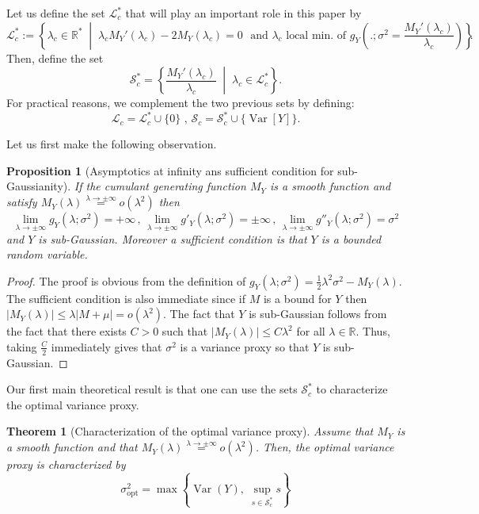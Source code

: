 \documentclass[a4paper, 10pt]{article}
\newcommand{\beq}{\begin{equation}}
\newcommand{\eeq}{\end{equation}}
\newtheorem{theorem}{Theorem}[section]
\newtheorem{proposition}{Proposition}[section]
\theoremstyle{definition}
\begin{document}
Let us define the set $\mathcal{L}_c^*$ that will play an important role in this paper by
\beq \mathcal{L}_c^*:=\left\{\lambda_c \in \mathbb{R}^* \;\middle|\;  \lambda_c M_Y'(\lambda_c)- 2M_Y(\lambda_c)=0 \,\, \text{ and }\lambda_c \text{ local min. of } g_Y\left(.;\sigma^2=\frac{ M_Y'(\lambda_c)}{\lambda_c}\right) \right\}.\eeq
Then, define the set
\beq \mathcal{S}_c^*=\left\{\frac{M_Y'(\lambda_c)}{\lambda_c}  \;\middle|\; \lambda_c\in \mathcal{L}_c^*\right\}.\eeq
For practical reasons, we complement the two previous sets by defining:
\beq \mathcal{L}_c=\mathcal{L}_c^*\cup\{0\}\,\,, \,\mathcal{S}_c=\mathcal{S}_c^*\cup\{\operatorname{Var}[Y]\}.\eeq 

Let us first make the following observation.
\begin{proposition}[Asymptotics at infinity ans sufficient condition for sub-Gaussianity]\label{AsymptInf}If the cumulant generating function $M_Y$ is a smooth function and satisfy $M_Y(\lambda)\overset{\lambda\to\pm \infty}{=}o(\lambda^2)$ then
\beq \lim_{\lambda\to \pm\infty}g_Y(\lambda;\sigma^2)=+\infty\,,\, \lim_{\lambda\to \pm\infty}g'_Y(\lambda;\sigma^2)=\pm\infty\,,\, \lim_{\lambda\to \pm\infty}g''_Y(\lambda;\sigma^2)=\sigma^2\eeq
and $Y$ is sub-Gaussian. Moreover a sufficient condition is that $Y$ is a bounded random variable.    
\end{proposition}

\begin{proof}The proof is obvious from the definition of $g_Y(\lambda;\sigma^2)=\frac{1}{2}\lambda^2\sigma^2-M_Y(\lambda)$. The sufficient condition is also immediate since if $M$ is a bound for $Y$ then
$|M_Y(\lambda)|\leq \lambda|M+\mu|=o(\lambda^2)$. The fact that $Y$ is sub-Gaussian follows from the fact that there exists $C>0$ such that $|M_Y(\lambda)|\leq C\lambda^2$ for all $\lambda\in \mathbb{R}$. Thus, taking $\frac{C}{2}$ immediately gives that $\sigma^2$ is a variance proxy so that $Y$ is sub-Gaussian.
\end{proof}


Our first main theoretical result is that one can use the sets $\mathcal{S}_c^*$ to characterize the optimal variance proxy.

\begin{theorem}[Characterization of the optimal variance proxy]\label{GeneralCharac} Assume that $M_Y$ is a smooth function and that $M_Y(\lambda)\overset{\lambda\to \pm\infty}{=}o(\lambda^2)$. Then, the optimal variance proxy is characterized by
\beq \sigma_{\mathrm{opt}}^2 = \max\left\{ \operatorname{Var}(Y),\; \sup_{s \in \mathcal{S}_c^*} s \right\} \eeq   
\end{theorem}
\end{document}
